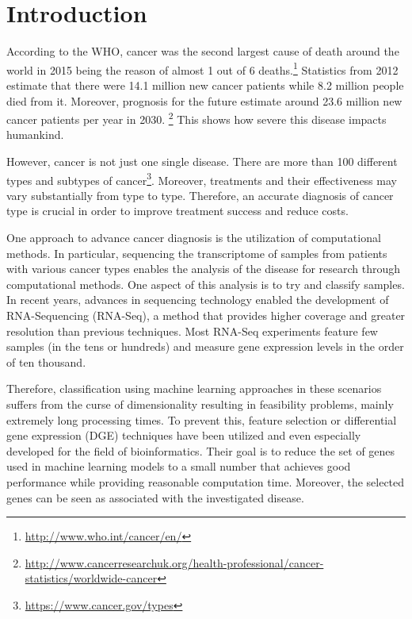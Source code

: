 \chapter{Introduction}
\label{chapter:introduction}

According to the WHO, cancer was the second largest cause of death around the world in 2015 being the reason of almost 1 out of 6 deaths.\footnote{\url{http://www.who.int/cancer/en/}} Statistics from 2012 estimate that there were 14.1 million new cancer patients while 8.2 million people died from it. \cite{Torre2015} Moreover, prognosis for the future estimate around 23.6 million new cancer patients per year in 2030. \footnote{\url{http://www.cancerresearchuk.org/health-professional/cancer-statistics/worldwide-cancer}} This shows how severe this disease impacts humankind.

However, cancer is not just one single disease. There are more than 100 different types and subtypes of cancer\footnote{\url{https://www.cancer.gov/types}}. Moreover, treatments and their effectiveness may vary substantially from type to type. Therefore, an accurate diagnosis of cancer type is crucial in order to improve treatment success and reduce costs. 

One approach to advance cancer diagnosis is the utilization of computational methods. In particular, sequencing the transcriptome of samples from patients with various cancer types enables the analysis of the disease for research through computational methods. One aspect of this analysis is to try and classify samples. In recent years, advances in sequencing technology enabled the development of RNA-Sequencing (RNA-Seq), a method that provides higher coverage and greater resolution than previous techniques. Most RNA-Seq experiments feature few samples (in the tens or hundreds) and measure gene expression levels in the order of ten thousand. 

Therefore, classification using machine learning approaches in these scenarios suffers from the curse of dimensionality resulting in feasibility problems, mainly extremely long processing times. To prevent this, feature selection or differential gene expression (DGE) techniques have been utilized and even especially developed for the field of bioinformatics. Their goal is to reduce the set of genes used in machine learning models to a small number that achieves good performance while providing reasonable computation time. Moreover, the selected genes can be seen as associated with the investigated disease.

